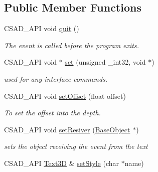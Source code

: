 \subsection*{Public Member Functions}
\begin{DoxyCompactItemize}
\item 
\hypertarget{classcsad_1_1_text3_d_ad6137b853b2d674cc34e318bac7abca7}{C\-S\-A\-D\-\_\-\-A\-P\-I void \hyperlink{classcsad_1_1_text3_d_ad6137b853b2d674cc34e318bac7abca7}{quit} ()}\label{classcsad_1_1_text3_d_ad6137b853b2d674cc34e318bac7abca7}

\begin{DoxyCompactList}\small\item\em The event is called before the program exits. \end{DoxyCompactList}\item 
\hypertarget{classcsad_1_1_text3_d_ad92bc8c88734d84afecdc6fb7fcd7d83}{C\-S\-A\-D\-\_\-\-A\-P\-I void $\ast$ \hyperlink{classcsad_1_1_text3_d_ad92bc8c88734d84afecdc6fb7fcd7d83}{set} (unsigned \-\_\-int32, void $\ast$)}\label{classcsad_1_1_text3_d_ad92bc8c88734d84afecdc6fb7fcd7d83}

\begin{DoxyCompactList}\small\item\em used for any interface commands. \end{DoxyCompactList}\item 
\hypertarget{classcsad_1_1_text3_d_a20c5cafb2d194dee028c9536e2ff903f}{C\-S\-A\-D\-\_\-\-A\-P\-I void \hyperlink{classcsad_1_1_text3_d_a20c5cafb2d194dee028c9536e2ff903f}{set\-Offset} (float offset)}\label{classcsad_1_1_text3_d_a20c5cafb2d194dee028c9536e2ff903f}

\begin{DoxyCompactList}\small\item\em To set the offset into the depth. \end{DoxyCompactList}\item 
\hypertarget{classcsad_1_1_text3_d_aaa37c053f2999d9b2c8c45b0380e0204}{C\-S\-A\-D\-\_\-\-A\-P\-I void \hyperlink{classcsad_1_1_text3_d_aaa37c053f2999d9b2c8c45b0380e0204}{set\-Resiver} (\hyperlink{classcsad_1_1_base_object}{Base\-Object} $\ast$)}\label{classcsad_1_1_text3_d_aaa37c053f2999d9b2c8c45b0380e0204}

\begin{DoxyCompactList}\small\item\em sets the object receiving the event from the text \end{DoxyCompactList}\item 
\hypertarget{classcsad_1_1_text3_d_a5a7528171be95e957c2346632801eae3}{C\-S\-A\-D\-\_\-\-A\-P\-I \hyperlink{classcsad_1_1_text3_d}{Text3\-D} \& \hyperlink{classcsad_1_1_text3_d_a5a7528171be95e957c2346632801eae3}{set\-Style} (char $\ast$name)}\label{classcsad_1_1_text3_d_a5a7528171be95e957c2346632801eae3}


\end{DoxyCompactItemize}
